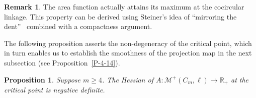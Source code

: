 \documentclass[11pt,letterpaper]{amsart}
\theoremstyle{plain}
\newtheorem{proposition}[theorem]{Proposition}
\theoremstyle{definition}
\newtheorem{remark}[theorem]{Remark}
\theoremstyle{remark}
\numberwithin{equation}{section}
\begin{document}
\begin{remark}%
The area function actually attains its maximum at the cocircular linkage. This property can be derived using Steiner's idea of ``mirroring the dent''~\cite{Steiner-1838} combined with a compactness argument.
\end{remark}

The following proposition asserts the non-degeneracy of the critical point, which in turn enables us to establish the smoothness of the projection map in the next subsection (see Proposition~\ref{P-4-14}).

\begin{proposition}\label{P-4-8}
Suppose $m\geq 4$. The Hessian of $A:\mathcal M^{+}(C_m,\ell)\to \mathbb R_+$ at the critical point is negative definite.
\end{proposition}
\end{document}
